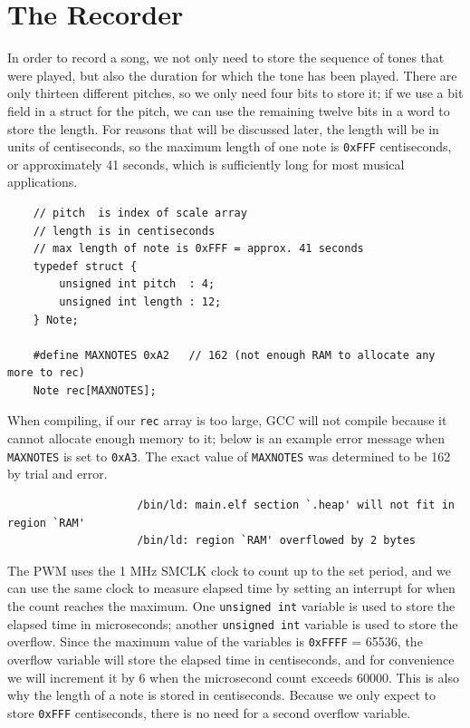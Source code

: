 \documentclass[letterpaper]{report}
\begin{document}
		\section{The Recorder} 
			In order to record a song, we not only need to store the sequence of tones that were played, but also the duration for which the tone has been played. There are only thirteen different pitches, so we only need four bits to store it; if we use a bit field in a struct for the pitch, we can use the remaining twelve bits in a word to store the length. For reasons that will be discussed later, the length will be in units of centiseconds, so the maximum length of one note is \texttt{0xFFF} centiseconds, or approximately 41 seconds, which is sufficiently long for most musical applications. 
				\begin{verbatim}
    // pitch  is index of scale array
    // length is in centiseconds
    // max length of note is 0xFFF = approx. 41 seconds
    typedef struct {
        unsigned int pitch  : 4;
        unsigned int length : 12;
    } Note;
    
    #define MAXNOTES 0xA2   // 162 (not enough RAM to allocate any more to rec)
    Note rec[MAXNOTES];
				\end{verbatim}
			When compiling, if our \texttt{rec} array is too large, GCC will not compile because it cannot allocate enough memory to it; below is an example error message when \texttt{MAXNOTES} is set to \texttt{0xA3}. The exact value of \texttt{MAXNOTES} was determined to be 162 by trial and error.
				\begin{verbatim}
					/bin/ld: main.elf section `.heap' will not fit in region `RAM'
					/bin/ld: region `RAM' overflowed by 2 bytes
				\end{verbatim}
			The PWM uses the 1 MHz SMCLK clock to count up to the set period, and we can use the same clock to measure elapsed time by setting an interrupt for when the count reaches the maximum. One \texttt{unsigned int} variable is used to store the elapsed time in microseconds; another \texttt{unsigned int} variable is used to store the overflow. Since the maximum value of the variables is \texttt{0xFFFF} = 65536, the overflow variable will store the elapsed time in centiseconds, and for convenience we will increment it by 6 when the microsecond count exceeds 60000. This is also why the length of a note is stored in centiseconds. Because we only expect to store \texttt{0xFFF} centiseconds, there is no need for a second overflow variable.
\end{document}

